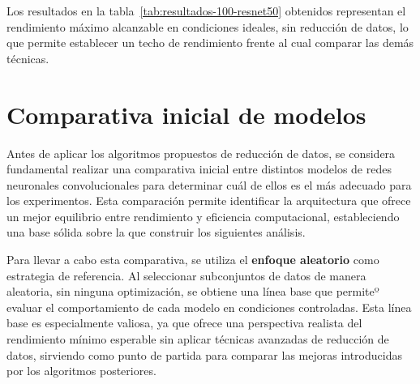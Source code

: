 Los resultados en la tabla~\ref{tab:resultados-100-resnet50} obtenidos representan el rendimiento máximo alcanzable en condiciones ideales,
sin reducción de datos, lo que permite establecer un techo de rendimiento frente al cual comparar las demás técnicas.


\section{Comparativa inicial de modelos}\label{sec:comparativa-inicial-modelos}
Antes de aplicar los algoritmos propuestos de reducción de datos, se considera fundamental realizar una comparativa inicial entre distintos
modelos de redes neuronales convolucionales para determinar cuál de ellos es el más adecuado para los experimentos.
Esta comparación permite identificar la arquitectura que ofrece un mejor equilibrio entre rendimiento y eficiencia computacional,
estableciendo una base sólida sobre la que construir los siguientes análisis.

Para llevar a cabo esta comparativa, se utiliza el \textbf{enfoque aleatorio} como estrategia de referencia.
Al seleccionar subconjuntos de datos de manera aleatoria, sin ninguna optimización, se obtiene una línea base que permiteº evaluar el
comportamiento de cada modelo en condiciones controladas.
Esta línea base es especialmente valiosa, ya que ofrece una perspectiva realista del rendimiento mínimo esperable sin aplicar técnicas
avanzadas de reducción de datos, sirviendo como punto de partida para comparar las mejoras introducidas por los algoritmos posteriores.


